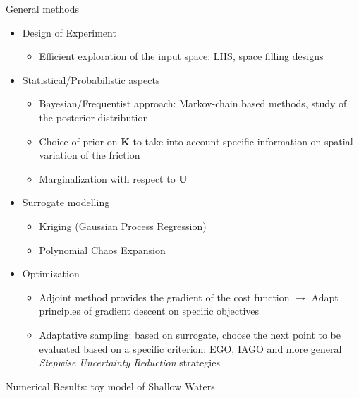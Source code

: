 \documentclass{beamer}
\newlength{\sndcolwid}
\begin{document}
\begin{frame}[t]
\begin{columns}[t]
\begin{column}{\sndcolwid}
\begin{block}{General methods}
\begin{itemize}
  \item Design of Experiment
    \begin{itemize}
    \item Efficient exploration of the input space: LHS, space filling designs
    \end{itemize}
  \item Statistical/Probabilistic aspects
    \begin{itemize}
    \item Bayesian/Frequentist approach: Markov-chain based methods, study of the posterior distribution
    \item Choice of prior on $\bm{K}$ to take into account specific information on spatial variation of the friction
    \item Marginalization with respect to $\bm{U}$
    \end{itemize}
  \item Surrogate modelling
    \begin{itemize}
    \item Kriging (Gaussian Process Regression)
    \item Polynomial Chaos Expansion
    \end{itemize}
  \item Optimization
    \begin{itemize}
    \item Adjoint method provides the gradient of the cost function $\rightarrow$ Adapt principles of gradient descent on specific objectives
    \item Adaptative sampling: based on surrogate, choose the next point to be evaluated based on a specific criterion: EGO, IAGO and more general \emph{Stepwise Uncertainty Reduction} strategies \nocite{jones_efficient_1998}
    \end{itemize}
  \end{itemize}
\end{block}
\begin{block}{Numerical Results: toy model of Shallow Waters}
  \begin{center}

\end{center}
\end{block}
\end{column}
\end{columns}
\end{frame}
\end{document}
